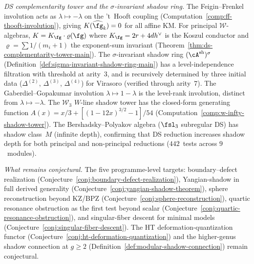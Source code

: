 \noindent\emph{DS complementarity tower and the $\sigma$-invariant
shadow ring.}
The Feigin--Frenkel involution acts as
$\lambda \mapsto -\lambda$ on the 't~Hooft coupling
(Computation~\ref{comp:ff-thooft-involution}),
giving $K(\widehat{\fg}_k) = 0$ for all affine KM\@.
For principal $\mathcal{W}$-algebras,
$K = K_\fg \cdot \varrho(\fg)$ where
$K_\fg = 2r + 4dh^\vee$ is the Koszul conductor and
$\varrho = \sum 1/(m_i{+}1)$ the exponent-sum invariant
(Theorem~\ref{thm:ds-complementarity-tower-main}).
The $\sigma$-invariant shadow ring $(\cA^{\mathrm{sh}})^\sigma$
(Definition~\ref{def:sigma-invariant-shadow-ring-main})
has a level-independence filtration with threshold at arity~$3$,
and is recursively determined by three initial data
($\Delta^{(2)}$, $\Delta^{(3)}$, $\Delta^{(4)}$)
for Virasoro (verified through arity~$7$).
The Gaberdiel--Gopakumar involution $\lambda \mapsto 1 - \lambda$
is the level-rank involution, distinct from
$\lambda \mapsto -\lambda$.
The $\mathcal{W}_3$ $W$-line shadow tower has the closed-form
generating function
$A(x) = x/3 + [(1{-}12x)^{3/2} - 1]/54$
(Computation~\ref{comp:w-infty-shadow-tower}).
The Bershadsky--Polyakov algebra ($\fsl_3$ subregular DS)
has shadow class~$M$ (infinite depth), confirming that
DS reduction increases shadow depth for both principal and
non-principal reductions ($442$~tests across $9$~modules).

\noindent\emph{What remains conjectural.}
The five programme-level targets:
boundary--defect realization
(Conjecture~\ref{conj:boundary-defect-realization}),
Yangian-shadow in full derived generality
(Conjecture~\ref{conj:yangian-shadow-theorem}),
sphere reconstruction beyond KZ/BPZ
(Conjecture~\ref{conj:sphere-reconstruction}),
quartic resonance obstruction as the first test beyond scalar
(Conjecture~\ref{conj:quartic-resonance-obstruction}), and
singular-fiber descent for minimal models
(Conjecture~\ref{conj:singular-fiber-descent}).
The HT deformation-quantization functor
(Conjecture~\ref{conj:ht-deformation-quantization}) and the
higher-genus shadow connection at $g \geq 2$
(Definition~\ref{def:modular-shadow-connection}) remain
conjectural.
